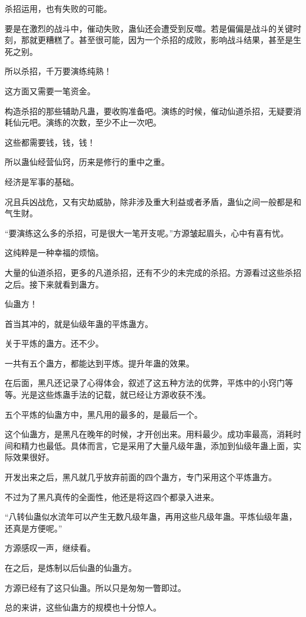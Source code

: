\begin{this_body}
杀招运用，也有失败的可能。

要是在激烈的战斗中，催动失败，蛊仙还会遭受到反噬。若是偏偏是战斗的关键时刻，那就更糟糕了。甚至很可能，因为一个杀招的成败，影响战斗结果，甚至是生死之别。

所以杀招，千万要演练纯熟！

这方面又需要一笔资金。

构造杀招的那些辅助凡蛊，要收购准备吧。演练的时候，催动仙道杀招，无疑要消耗仙元吧。演练的次数，至少不止一次吧。

这些都需要钱，钱，钱！

所以蛊仙经营仙窍，历来是修行的重中之重。

经济是军事的基础。

况且兵凶战危，又有灾劫威胁，除非涉及重大利益或者矛盾，蛊仙之间一般都是和气生财。

“要演练这么多的杀招，可是很大一笔开支呢。”方源皱起眉头，心中有喜有忧。

这纯粹是一种幸福的烦恼。

大量的仙道杀招，更多的凡道杀招，还有不少的未完成的杀招。方源看过这些杀招之后。接下来就看到蛊方。

仙蛊方！

首当其冲的，就是仙级年蛊的平炼蛊方。

关于平炼的蛊方。还不少。

一共有五个蛊方，都能达到平炼。提升年蛊的效果。

在后面，黑凡还记录了心得体会，叙述了这五种方法的优弊，平炼中的小窍门等等。光是这些炼蛊手法的记载，就已经让方源收获不浅。

五个平炼的仙蛊方中，黑凡用的最多的，是最后一个。

这个仙蛊方，是黑凡在晚年的时候，才开创出来。用料最少。成功率最高，消耗时间和精力也最低。具体而言，它是采用了大量凡级年蛊，添加到仙级年蛊上面，实际效果很好。

开发出来之后，黑凡就几乎放弃前面的四个蛊方，专门采用这个平炼蛊方。

不过为了黑凡真传的全面性，他还是将这四个都录入进来。

“八转仙蛊似水流年可以产生无数凡级年蛊，再用这些凡级年蛊。平炼仙级年蛊，还真是方便呢。”

方源感叹一声，继续看。

在之后，是炼制以后仙蛊的仙蛊方。

方源已经有了这只仙蛊。所以只是匆匆一瞥即过。

总的来讲，这些仙蛊方的规模也十分惊人。


\end{this_body}
